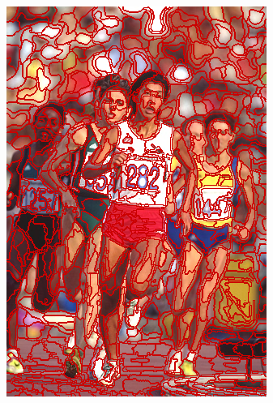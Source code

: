 \begin{figure}
{		\includegraphics[scale=\scalefivebsdtest]{pictures/bsd-test-8-crs}
	}
	\subfigure{
}
\end{figure}
